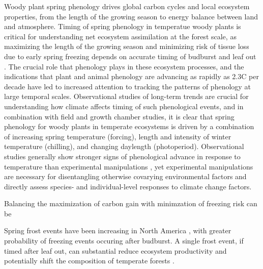 \documentclass[12pt]{article}
\begin{document}

Woody plant spring phenology drives global carbon cycles and local ecosystem properties, from the length of the growing season to energy balance between land and atmosphere. Timing of spring phenology in temperatue woody plants is critical for understanding net ecosystem assimilation at the forest scale, as maximizing the length of the growing season and minimizing risk of tissue loss due to early spring freezing depends on accurate timing of budburst and leaf out \cite{Basler:2014aa}. The crucial role that phenology plays in these ecosystem processes, and the indications that plant and animal phenology are advancing as rapidly as 2.3\degree C per decade \cite{Menzel:2006} have led to increased attention to tracking the patterns of phenology at large temporal scales. Observational studies of long-term trends are crucial for understanding how climate affects timing of such phenological events, and in combination with field and growth chamber studies, it is clear that spring phenology for woody plants in temperate ecosystems is driven by a combination of increasing spring temperature (forcing), length and intensity of winter temperature (chilling), and changing daylength (photoperiod). Observational studies generally show stronger signs of phenological advance in response to temperature than experimental manipulations \cite{Wolkovich:2012aa}, yet experimental manipulations are necessary for disentangling otherwise covarying environmental factors and directly assess species- and individual-level responses to climate change factors. 

Balancing the maximization of carbon gain with minimzation of freezing risk can be 


Spring frost events have been increasing in North America \cite{Augspurger:2013aa}, with greater probability of freezing events occuring after budburst. A single frost event, if timed after leaf out, can substantial reduce ecosystem productivity and potentially shift the composition of temperate forests \cite{Hufkens:2012aa}. 
\end{document}
